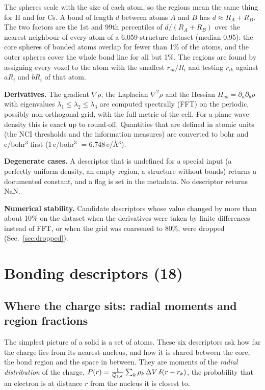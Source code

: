 \documentclass[11pt,a4paper]{article}
\begin{document}
\medskip
The spheres scale with the size of each atom, so the regions mean the same thing for H and for
Cs. A bond of length $d$ between atoms $A$ and $B$ has $d\approx R_A+R_B$. The two factors are the
1st and 99th percentiles of $d/(R_A+R_B)$ over the nearest neighbour of every atom of a
6,059-structure dataset (median 0.95): the core spheres of bonded atoms overlap for fewer than 1\%
of the atoms, and the outer spheres cover the whole bond line for all but 1\%. The regions are
found by assigning every voxel to the atom with the smallest $r_{ik}/R_i$ and testing $r_{ik}$
against $aR_i$ and $bR_i$ of that atom.

\textbf{Derivatives.} The gradient $\nabla\rho$, the Laplacian $\nabla^2\rho$ and the Hessian
$H_{ab}=\partial_a\partial_b\rho$ with eigenvalues $\lambda_1\le\lambda_2\le\lambda_3$ are computed
spectrally (FFT) on the periodic, possibly non-orthogonal grid, with the full metric of the cell.
For a plane-wave density this is exact up to round-off. Quantities that are defined in atomic units
(the NCI thresholds and the information measures) are converted to bohr and e/bohr$^3$ first
($1$\,e/bohr$^3$ $=6.748$\,e/\AA$^3$).

\textbf{Degenerate cases.} A descriptor that is undefined for a special input (a perfectly uniform
density, an empty region, a structure without bonds) returns a documented constant, and a flag is
set in the metadata. No descriptor returns NaN.

\textbf{Numerical stability.} Candidate descriptors whose value changed by more than about 10\% on
the dataset when the derivatives were taken by finite differences instead of FFT, or when the grid
was coarsened to 80\%, were dropped (Sec.~\ref{sec:dropped}).

\section{Bonding descriptors (18)}

\subsection{Where the charge sits: radial moments and region fractions}
The simplest picture of a solid is a set of atoms. These six descriptors ask how far the charge
lies from its nearest nucleus, and how it is shared between the core, the bond region and the space
in between. They are moments of the \emph{radial distribution} of the charge,
$P(r)=\frac{1}{Q_{\rm tot}}\sum_k\rho_k\,\Delta V\,\delta(r-r_k)$, the probability that an electron
is at distance $r$ from the nucleus it is closest to.
\end{document}
